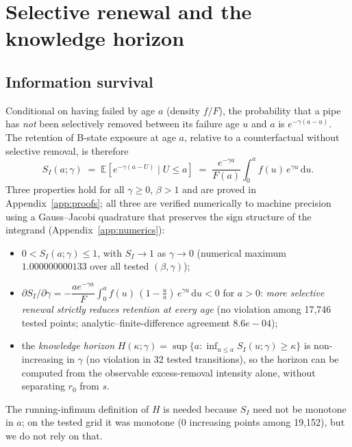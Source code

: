 \documentclass[review,12pt,authoryear]{elsarticle}
\begin{document}
\section{Selective renewal and the knowledge horizon}
\label{sec:horizon}

\subsection{Information survival}
Conditional on having failed by age $a$ (density $f/F$), the probability
that a pipe has \emph{not} been selectively removed between its failure age
$u$ and $a$ is $e^{-\gamma(a-u)}$. The retention of B-state exposure at age
$a$, relative to a counterfactual without selective removal, is therefore
\begin{equation}
S_I(a;\gamma) \;=\; \mathbb{E}\!\left[e^{-\gamma(a-U)} \mid U\le a\right]
\;=\; \frac{e^{-\gamma a}}{F(a)}\int_0^a f(u)\,e^{\gamma u}\,\mathrm{d}u .
\label{eq:SI}
\end{equation}
Three properties hold for all $\gamma\ge0$, $\beta>1$ and are proved in
Appendix~\ref{app:proofs}; all three are verified numerically to machine
precision using a Gauss--Jacobi quadrature that preserves the sign structure
of the integrand (Appendix~\ref{app:numerics}):
\begin{itemize}
\item[\textup{(P1)}] $0 < S_I(a;\gamma) \le 1$, with $S_I \to 1$ as
$\gamma\to0$ (numerical maximum $1.000000000133$ over all tested
$(\beta,\gamma)$);
\item[\textup{(P2)}] $\partial S_I/\partial\gamma =
-\dfrac{a e^{-\gamma a}}{F}\int_0^a f(u)\,(1-\tfrac{u}{a})\,e^{\gamma u}
\,\mathrm{d}u < 0$ for $a>0$: \emph{more selective renewal strictly reduces
retention at every age} (no violation among 17,746 tested points;
analytic--finite-difference agreement $8.6e-04$);
\item[\textup{(P3)}] the \emph{knowledge horizon}
$H(\kappa;\gamma) = \sup\{a : \inf_{u\le a} S_I(u;\gamma) \ge \kappa\}$ is
non-increasing in $\gamma$ (no violation in 32 tested transitions),
so the horizon can be computed from the observable excess-removal intensity
alone, without separating $r_0$ from $s$.
\end{itemize}
The running-infimum definition of $H$ is needed because $S_I$ need not be
monotone in $a$; on the tested grid it was monotone
(0 increasing points among 19,152), but we do not rely on that.
\end{document}
